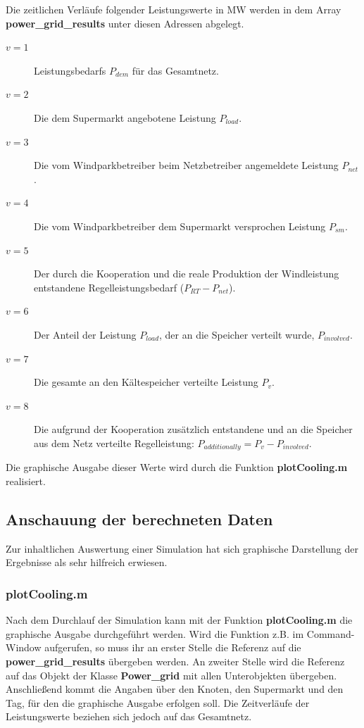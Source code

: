 Die zeitlichen Verl\"aufe folgender Leistungswerte in MW werden in dem Array
\textbf{power\_grid\_results} unter diesen Adressen abgelegt.
\begin{description}
\item[$v=1$] Leistungsbedarfs $P_{dem}$ f\"ur das Gesamtnetz.
\item[$v=2$] Die dem Supermarkt angebotene Leistung $P_{load}$.
\item[$v=3$] Die vom Windparkbetreiber beim Netzbetreiber angemeldete Leistung
$P_{net}$.
\item[$v=4$] Die vom Windparkbetreiber dem Supermarkt versprochen Leistung
$P_{sm}$.
\item[$v=5$] Der durch die Kooperation und die reale Produktion der Windleistung
entstandene Regelleistungsbedarf ($P_{RT}-P_{net}$).
\item[$v=6$] Der Anteil der Leistung $P_{load}$, der an die Speicher verteilt
wurde, $P_{involved}$.
\item[$v=7$] Die gesamte an den K\"altespeicher verteilte Leistung $P_v$.
\item[$v=8$] Die aufgrund der Kooperation zus\"atzlich entstandene und an die
Speicher aus dem Netz verteilte Regelleistung: $P_{additionally} = P_v -
P_{involved}$.


\end{description}
Die graphische Ausgabe dieser Werte wird durch die Funktion
\textbf{plotCooling.m} realisiert.

\subsection*{Anschauung der berechneten Daten}
Zur inhaltlichen Auswertung einer Simulation hat sich graphische Darstellung der
Ergebnisse als sehr hilfreich erwiesen.

\subsubsection*{plotCooling.m} Nach dem Durchlauf der Simulation kann mit der
Funktion \textbf{plotCooling.m} die graphische Ausgabe durchgef\"uhrt werden.
Wird die Funktion z.B. im \matlab Command-Window aufgerufen, so muss ihr an
erster Stelle die Referenz auf die \textbf{power\_grid\_results} \"ubergeben
werden.  An zweiter Stelle wird die Referenz auf das Objekt der Klasse
\textbf{Power\_grid} mit allen Unterobjekten \"ubergeben.  Anschlie\ss end kommt
die Angaben \"uber den Knoten, den Supermarkt und den Tag, f\"ur den die
graphische Ausgabe erfolgen soll. Die Zeitverl\"aufe der Leistungswerte beziehen
sich jedoch auf das Gesamtnetz.

